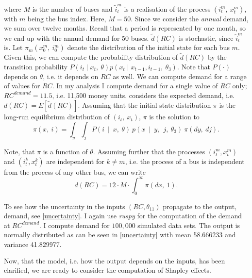 \noindent where $M$ is the number of buses and ${\tilde{i}}_t^m$ is a realisation of the process $(i_t^m,\ x_t^m)$, with $m$ being the bus index. Here, $M=50$. Since we consider the \textit{annual} demand, we sum over twelve months. Recall that a period is represented by one month, so we end up with the annual demand for 50 buses. $\tilde{d}(RC)$ is stochastic, since ${\tilde{i}}_t^m$ is. Let $\pi_m(x_0^m,\ i_0^m)$ denote the distribution of the initial state for each bus $m$. Given this, we can compute the probability distribution of $\tilde{d}(RC) $ by the transition probability $P(i_t \mid x_t,\ \theta)p(x_t \mid x_{t-1}, i_{t-1},\ \theta_3) $. Note that $P(\cdot)$ depends on $\theta$, i.e. it depends on $RC$ as well. We can compute demand for a range of values for $RC$. In my analysis I compute demand for a single value of $RC$ only; $RC^{demand}=11.5$, i.e. 11,500 money units. \citet{R87} considers the expected demand, i.e. $d(RC)=E[\tilde{d}(RC)]$. Assuming that the initial state distribution $\pi$ is the long-run equilibrium distribution of $(i_t,\ x_t)$, $\pi$ is the solution to
\begin{equation}
\pi(x,\ i)=\int_y \int_j P(i\ \mid\ x,\ \theta)\ p(x\ \mid\ y,\ \ j,\ \theta_3)\ \pi(dy,\ dj).
\end{equation}

Note, that $\pi$ is a function of $\theta$. Assuming further that the processes $ (i_t^m, x_t^m)$ and $(i_t^k, x_t^k)$ are independent for $k \neq m$, i.e. the process of a bus is independent from the process of any other bus, we can write
\begin{equation}
d(RC)=12 \cdot M \cdot \int_0^{\infty} \pi(dx,\ 1).
\end{equation}

To see how the uncertainty in the inputs $(RC, \theta_{11})$ propagate to the output, demand, see \cref{uncertainty}. I again use \textit{ruspy} for the computation of the demand at $RC^{demand}$. I compute demand for $100,000$ simulated data sets. The output is normally distributed as can be seen in \cref{uncertainty} with mean 58.666233 and variance 41.829977.

Now, that the model, i.e. how the output depends on the inputs, has been clarified, we are ready to consider the computation of Shapley effects.
